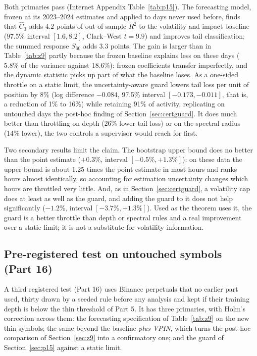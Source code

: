 \documentclass[12pt]{article}
\theoremstyle{definition}
\theoremstyle{remark}
\begin{document}
Both primaries pass (Internet Appendix Table~\ref{tab:p15}). The forecasting model, frozen at its 2023--2024 estimates and applied to days never used before, finds that $\hat C_3$ adds $4.2$ points of out-of-sample $R^2$ to the volatility and impact baseline (97.5\% interval $[1.6,8.2]$, Clark--West $t=9.9$) and improves tail classification; the summed response $S_{60}$ adds $3.3$ points. The gain is larger than in Table~\ref{tab:z9} partly because the frozen baseline explains less on these days ($5.8\%$ of the variance against $18.6\%$): frozen coefficients transfer imperfectly, and the dynamic statistic picks up part of what the baseline loses. As a one-sided throttle on a static limit, the uncertainty-aware guard lowers tail loss per unit of position by 8\% (log difference $-0.084$, 97.5\% interval $[-0.173,-0.011]$, that is, a reduction of 1\% to 16\%) while retaining 91\% of activity, replicating on untouched days the post-hoc finding of Section~\ref{sec:certguard}. It does much better than throttling on depth (26\% lower tail loss) or on the spectral radius (14\% lower), the two controls a supervisor would reach for first.

Two secondary results limit the claim. The bootstrap upper bound does no better than the point estimate ($+0.3\%$, interval $[-0.5\%,+1.3\%]$): on these data the upper bound is about 1.25 times the point estimate in most hours and ranks hours almost identically, so accounting for estimation uncertainty changes which hours are throttled very little. And, as in Section~\ref{sec:certguard}, a volatility cap does at least as well as the guard, and adding the guard to it does not help significantly ($-1.2\%$, interval $[-3.7\%,+1.3\%]$). Used as the theorem uses it, the guard is a better throttle than depth or spectral rules and a real improvement over a static limit; it is not a substitute for volatility information.

\subsection{Pre-registered test on untouched symbols (Part 16)}\label{sec:p16}
A third registered test (Part 16) uses Binance perpetuals that no earlier part used, thirty drawn by a seeded rule before any analysis and kept if their training depth is below the thin threshold of Part 5. It has three primaries, with Holm's correction across them: the forecasting specification of Table~\ref{tab:z9} on the new thin symbols; the same beyond the baseline \emph{plus VPIN}, which turns the post-hoc comparison of Section~\ref{sec:z9} into a confirmatory one; and the guard of Section~\ref{sec:p15} against a static limit.
\end{document}
